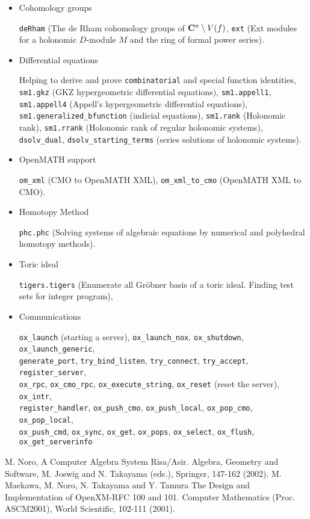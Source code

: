 \documentclass[12pt]{article}
\begin{document}
\begin{itemize}
\item Cohomology groups

{\tt deRham} (The de Rham cohomology groups of
${\bf C}^n \setminus V(f)$,
{\tt ext} (Ext modules for a holonomic $D$-module $M$
and the ring of formal power series).

\item Differential equations

Helping to derive and prove {\tt combinatorial} and
{special function identities},
{\tt sm1.gkz} (GKZ hypergeometric differential equations),
{\tt sm1.appell1}, {\tt sm1.appell4} (Appell's hypergeometric differential equations),
{\tt sm1.generalized\_bfunction} (indicial equations),
{\tt sm1.rank} (Holonomic rank),
{\tt sm1.rrank} (Holonomic rank of regular holonomic systems),
{\tt dsolv\_dual}, {\tt dsolv\_starting\_terms} (series solutions of holonomic systems).

\item OpenMATH support

{\tt om\_xml} (CMO to OpenMATH XML),
{\tt om\_xml\_to\_cmo} (OpenMATH XML to CMO).

\item Homotopy Method

{\tt phc.phc} (Solving systems of algebraic equations by
numerical and polyhedral homotopy methods).

\item Toric ideal

{\tt tigers.tigers} (Enumerate all Gr\"obner basis of a toric ideal.
Finding test sets for integer program),

\item Communications

{\tt ox\_launch} (starting a server),
{\tt ox\_launch\_nox},
{\tt ox\_shutdown},
{\tt ox\_launch\_generic},\\
{\tt generate\_port},
{\tt try\_bind\_listen},
{\tt try\_connect},
{\tt try\_accept},
{\tt register\_server},\\
{\tt ox\_rpc},
{\tt ox\_cmo\_rpc},
{\tt ox\_execute\_string},
{\tt ox\_reset} (reset the server),
{\tt ox\_intr},\\
{\tt register\_handler},
{\tt ox\_push\_cmo},
{\tt ox\_push\_local},
{\tt ox\_pop\_cmo},
{\tt ox\_pop\_local},\\
{\tt ox\_push\_cmd},
{\tt ox\_sync},
{\tt ox\_get},
{\tt ox\_pops},
{\tt ox\_select},
{\tt ox\_flush},
{\tt ox\_get\_serverinfo}

\end{itemize}

\begin{thebibliography}{99}
M. Noro,  A Computer Algebra System Risa/Asir.  Algebra, Geometry and Software, M. Joswig and N. Takayama (eds.), Springer, 147-162 (2002).
M. Maekawa, M. Noro, N. Takayama and Y. Tamura
The Design and Implementation of OpenXM-RFC 100 and 101.
Computer Mathematics (Proc. ASCM2001), World Scientific, 102-111 (2001).
\end{thebibliography}
\end{document}
